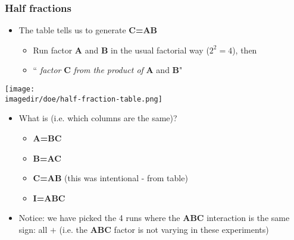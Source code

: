 \begin{frame}\frametitle{Half fractions}
	\begin{itemize}
		\item	The table tells us to generate \textbf{C=AB}
		\begin{itemize}
			\item	Run factor \textbf{A} and \textbf{B} in the usual factorial way ($2^2 = 4$), then
			\item	``\emph{{\color{purple}{generate}} factor} \textbf{C} \emph{from the product of} \textbf{A} and \textbf{B}"
		\end{itemize}
	\end{itemize}
	\begin{center}
		\texttt{[image: \\imagedir/doe/half-fraction-table.png]}
	\end{center}
	\begin{itemize}
		\item	What is {\color{purple}{confounded}} (i.e. which columns are the same)?
		\begin{itemize}
			\item	\textbf{A=BC}
			\item	\textbf{B=AC}
			\item	\textbf{C=AB} (this was intentional - from table)
			\item	\textbf{I=ABC}
		\end{itemize}
	\end{itemize}
	\begin{itemize}
		\item	Notice: we have picked the 4 runs where the \textbf{ABC} interaction is the same sign: all $+$ (i.e. the \textbf{ABC} factor is not varying in these experiments)
	\end{itemize}
\end{frame}

